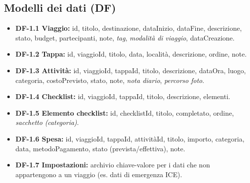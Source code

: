\documentclass[11pt, a4paper]{article}
\begin{document}
\subsection{Modelli dei dati (DF)}
\begin{itemize}[noitemsep]
    \item \textbf{DF-1.1 Viaggio:} id, titolo, destinazione, dataInizio,
    dataFine, descrizione, stato, budget, partecipanti, note, \textit{tag},
    \textit{modalità di viaggio}, dataCreazione.
    \item \textbf{DF-1.2 Tappa:} id, viaggioId, titolo, data, località,
    descrizione, ordine, note.
    \item \textbf{DF-1.3 Attività:} id, viaggioId, tappaId, titolo, descrizione,
    dataOra, luogo, categoria, costoPrevisto, stato, note, \textit{nota diario},
    \textit{percorso foto}.
    \item \textbf{DF-1.4 Checklist:} id, viaggioId, tappaId, titolo, descrizione,
    elementi.
    \item \textbf{DF-1.5 Elemento checklist:} id, checklistId, titolo,
    completato, ordine, \textit{sacchetto (categoria)}.
    \item \textbf{DF-1.6 Spesa:} id, viaggioId, tappaId, attivitàId, titolo,
    importo, categoria, data, metodoPagamento, stato (prevista/effettiva), note.
    \item \textbf{DF-1.7 Impostazioni:} archivio chiave-valore per i dati che non
    appartengono a un viaggio (es. dati di emergenza ICE).
\end{itemize}
\end{document}
